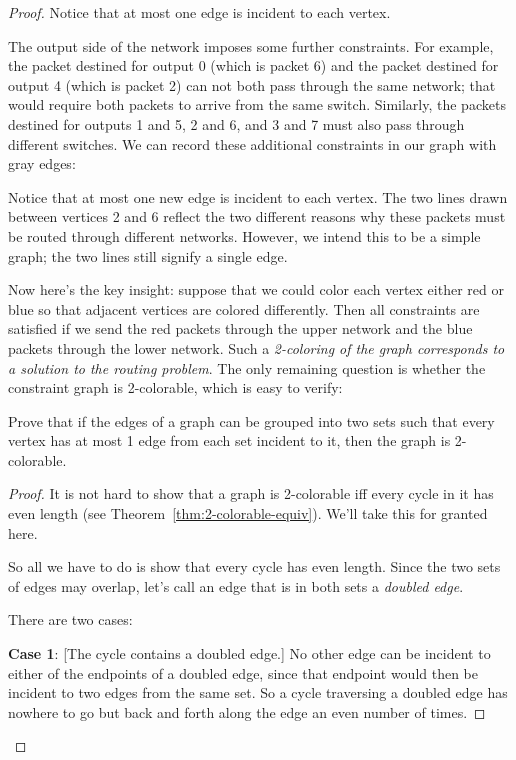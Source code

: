 \begin{proof}
Notice that at most one edge is incident to each vertex.

The output side of the network imposes some further constraints.  For
example, the packet destined for output 0 (which is packet 6) and the
packet destined for output 4 (which is packet 2) can not both pass
through the same network; that would require both packets to arrive
from the same switch.  Similarly, the packets destined for outputs 1
and 5, 2 and 6, and 3 and 7 must also pass through different switches.
We can record these additional constraints in our graph with gray
edges:
\begin{center}
\end{center}

Notice that at most one new edge is incident to each vertex.
The two lines drawn between vertices 2 and 6 reflect the two different
reasons why these packets must be routed through different networks.
However, we intend this to be a simple graph; the two lines still
signify a single edge.

Now here's the key insight: suppose that we could color each vertex
either red or blue so that adjacent vertices are colored differently.
Then all constraints are satisfied if we send the red packets through
the upper network and the blue packets through the lower network.
Such a \textit{2-coloring of the graph corresponds to a solution to
  the routing problem}.  The only remaining question is whether the
constraint graph is 2-colorable, which is easy to verify:

\begin{lemma}\label{deg1-union}
  Prove that if the edges of a graph can be grouped into two sets such
  that every vertex has at most 1 edge from each set incident to it, then
  the graph is 2-colorable.
\end{lemma}

\begin{proof}
It is not hard to show that a graph is 2-colorable iff every cycle in
it has even length (see Theorem~\ref{thm:2-colorable-equiv}).
We'll take this for granted here.

  \iffalse We know from Theorem~\ref{odd-cycle} that \fi
So all we have to do is show that every cycle has even length.  Since
the two sets of edges may overlap, let's call an edge that is in both
sets a \emph{doubled edge}.

There are two cases:

  \textbf{Case 1}: [The cycle contains a doubled edge.]  No other edge can
  be incident to either of the endpoints of a doubled edge, since that
  endpoint would then be incident to two edges from the same set.  So a
  cycle traversing a doubled edge has nowhere to go but back and forth
  along the edge an even number of times.


\end{proof}
\end{proof}
